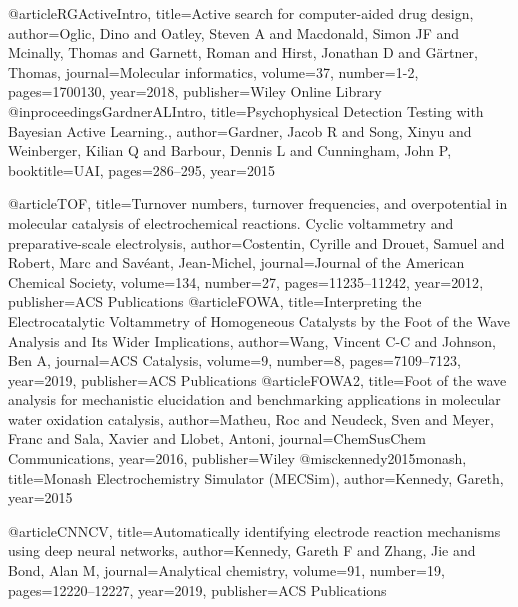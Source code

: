 @article{RGActiveIntro,
  title={Active search for computer-aided drug design},
  author={Oglic, Dino and Oatley, Steven A and Macdonald, Simon JF and Mcinally, Thomas and Garnett, Roman and Hirst, Jonathan D and G{\"a}rtner, Thomas},
  journal={Molecular informatics},
  volume={37},
  number={1-2},
  pages={1700130},
  year={2018},
  publisher={Wiley Online Library}
}
@inproceedings{GardnerALIntro,
  title={Psychophysical Detection Testing with Bayesian Active Learning.},
  author={Gardner, Jacob R and Song, Xinyu and Weinberger, Kilian Q and Barbour, Dennis L and Cunningham, John P},
  booktitle={UAI},
  pages={286--295},
  year={2015}
}


@article{TOF,
  title={Turnover numbers, turnover frequencies, and overpotential in molecular catalysis of electrochemical reactions. Cyclic voltammetry and preparative-scale electrolysis},
  author={Costentin, Cyrille and Drouet, Samuel and Robert, Marc and Savéant, Jean-Michel},
  journal={Journal of the American Chemical Society},
  volume={134},
  number={27},
  pages={11235--11242},
  year={2012},
  publisher={ACS Publications}
}
@article{FOWA,
  title={Interpreting the Electrocatalytic Voltammetry of Homogeneous Catalysts by the Foot of the Wave Analysis and Its Wider Implications},
  author={Wang, Vincent C-C and Johnson, Ben A},
  journal={ACS Catalysis},
  volume={9},
  number={8},
  pages={7109--7123},
  year={2019},
  publisher={ACS Publications}
}
@article{FOWA2,
  title={Foot of the wave analysis for mechanistic elucidation and benchmarking applications in molecular water oxidation catalysis},
  author={Matheu, Roc and Neudeck, Sven and Meyer, Franc and Sala, Xavier and Llobet, Antoni},
  journal={ChemSusChem Communications},
  year={2016},
  publisher={Wiley}
}
@misc{kennedy2015monash,
  title={Monash Electrochemistry Simulator (MECSim)},
  author={Kennedy, Gareth},
  year={2015}
}

@article{CNNCV,
  title={Automatically identifying electrode reaction mechanisms using deep neural networks},
  author={Kennedy, Gareth F and Zhang, Jie and Bond, Alan M},
  journal={Analytical chemistry},
  volume={91},
  number={19},
  pages={12220--12227},
  year={2019},
  publisher={ACS Publications}
}

